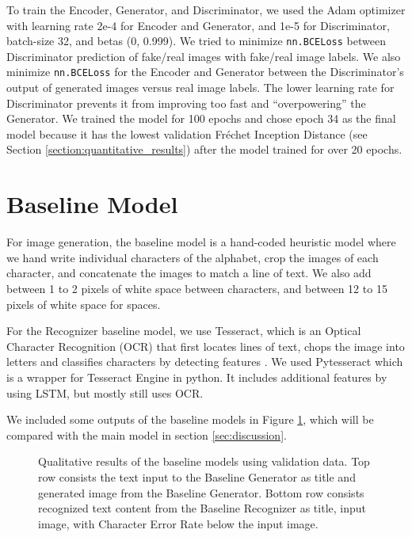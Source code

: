 \documentclass{article} %
\begin{document}
To train the Encoder, Generator, and Discriminator, we used the Adam optimizer with learning rate 2e-4 for Encoder and Generator, and 1e-5 for Discriminator, batch-size 32, and betas (0, 0.999). We tried to minimize \texttt{nn.BCELoss} between Discriminator prediction of fake/real images with fake/real image labels. We also minimize \texttt{nn.BCELoss} for the Encoder and Generator between the Discriminator's output of generated images versus real image labels. The lower learning rate for Discriminator prevents it from improving too fast and ``overpowering'' the Generator. We trained the model for 100 epochs and chose epoch 34 as the final model because it has the lowest validation Fréchet Inception Distance (see Section \ref{section:quantitative_results}) after the model trained for over 20 epochs.

\section{Baseline Model}
For image generation, the baseline model is a hand-coded heuristic model where we hand write individual characters of the alphabet, crop the images of each character, and concatenate the images to match a line of text. We also add between 1 to 2 pixels of white space between characters, and between 12 to 15 pixels of white space for spaces.

For the Recognizer baseline model, we use Tesseract, which is an Optical Character Recognition (OCR) that first locates lines of text, chops the image into letters and classifies characters by detecting features \citep{TessOverview}\citep{PageLayout}\citep{ScriptDetect}\citep{Multilingual}\citep{TableDetect}. We used Pytesseract which is a wrapper for Tesseract Engine in python. It includes additional features by using LSTM, but mostly still uses OCR.

We included some outputs of the baseline models in Figure \ref{fig:baseline_qualitative}, which will be compared with the main model in section \ref{sec:discussion}.

\begin{figure}[!hbpt]
    \begin{center}
        
    \end{center}
    \caption{Qualitative results of the baseline models using validation data. Top row consists the text input to the Baseline Generator as title and generated image from the Baseline Generator. Bottom row consists recognized text content from the Baseline Recognizer as title, input image, with Character Error Rate below the input image.}
    \label{fig:baseline_qualitative}
\end{figure}
\end{document}
